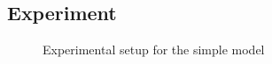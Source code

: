 \subsection{Experiment}

\begin{figure}

\caption{Experimental setup for the simple model}
\end{figure}
